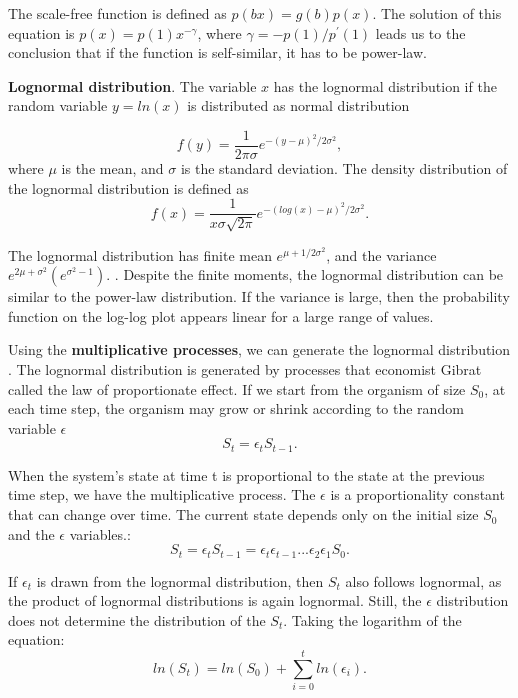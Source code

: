 The scale-free function is defined as $p(bx) = g(b)p(x)$. The solution of this equation is $p(x)=p(1)x^{-\gamma}$, where  $\gamma=-p(1)/p^{'}(1)$ leads us to the conclusion that if the function is self-similar, it has to be power-law.

\textbf{Lognormal distribution}. The variable $x$ has the lognormal distribution if the random variable $y=ln(x)$ is distributed as normal distribution \cite{limpert2001log} 

\begin{equation}
f(y) = \frac{1}{2\pi\sigma}e^{-(y-\mu)^2/2\sigma^2},
\end{equation}
where $\mu$ is the mean, and $\sigma$ is the standard deviation. The density distribution of the lognormal distribution is defined as
\begin{equation}
f(x) = \frac{1}{x \sigma \sqrt{2\pi}}e^{-(log(x)-\mu)^2 /2\sigma^2} .
\end{equation}

The lognormal distribution has finite mean $e^{\mu+1/2\sigma^2}$, and the variance $e^{2\mu+\sigma^2}(e^{\sigma^2 -1})$.  \cite{mitzenmacher2004brief}. Despite the finite moments, the lognormal distribution can be similar to the power-law distribution. If the variance is large, then the probability function on the log-log plot appears linear for a large range of values. 

Using the \textbf{multiplicative processes}, we can generate the lognormal distribution \cite{caldarelli2007scalefree, mitzenmacher2004brief}. The lognormal distribution is generated by processes that economist Gibrat called the law of proportionate effect. If we start from the organism of size $S_0$, at each time step, the organism may grow or shrink according to the random variable $\epsilon$ \cite{mitzenmacher2004brief}
\begin{equation}
S_t = \epsilon_t S_{t-1}.
\end{equation}

When the system's state at time t is proportional to the state at the previous time step, we have the multiplicative process. The $\epsilon$ is a proportionality constant that can change over time. The current state depends only on the initial size $S_0$ and the $\epsilon$ variables.:
\begin{equation}
S_t = \epsilon_t S_{t-1} = \epsilon_t \epsilon_{t-1}... \epsilon_2 \epsilon_1 S_{0}.
\end{equation}

If $\epsilon_t$ is drawn from the lognormal distribution, then $S_t$ also follows lognormal, as the product of lognormal distributions is again lognormal. Still, the $\epsilon$ distribution does not determine the distribution of the $S_t$. Taking the logarithm of the equation:
\begin{equation}
ln(S_t) = ln(S_0) + \sum_{i=0}^{t} ln(\epsilon_i).
\end{equation}

